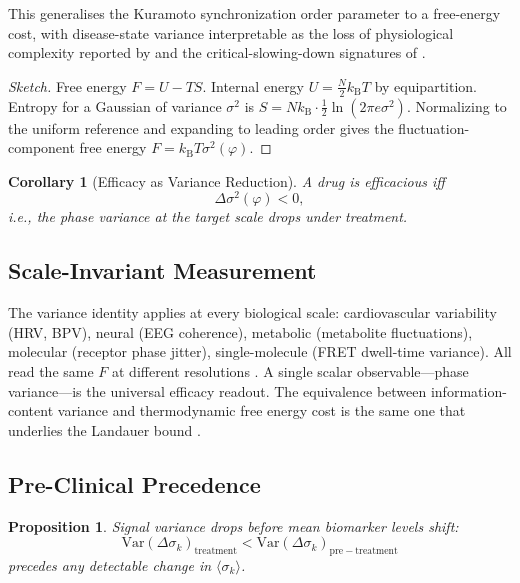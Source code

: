 \documentclass[twocolumn,10pt,a4paper]{article}
\newtheorem{proposition}[theorem]{Proposition}
\newtheorem{corollary}[theorem]{Corollary}
\theoremstyle{definition}
\theoremstyle{remark}
\newcommand{\kB}{k_{\mathrm{B}}}
\begin{document}
This generalises the Kuramoto synchronization order parameter \citep{kuramoto_1975,strogatz_2000,acebron_2005} to a free-energy cost, with disease-state variance interpretable as the loss of physiological complexity reported by \citet{goldberger_2002} and the critical-slowing-down signatures of \citet{scheffer_2009}.

\begin{proof}[Sketch]
Free energy $F = U - TS$. Internal energy $U = \tfrac{N}{2}\kB T$ by equipartition. Entropy for a Gaussian of variance $\sigma^2$ is $S = N\kB\cdot\tfrac{1}{2}\ln(2\pi e\sigma^2)$. Normalizing to the uniform reference and expanding to leading order gives the fluctuation-component free energy $F = \kB T\sigma^2(\varphi)$.
\end{proof}

\begin{corollary}[Efficacy as Variance Reduction]
A drug is efficacious iff
\begin{equation}
    \Delta\sigma^2(\varphi) < 0,
\end{equation}
i.e., the phase variance at the target scale drops under treatment.
\end{corollary}

\subsection{Scale-Invariant Measurement}

The variance identity applies at every biological scale: cardiovascular variability (HRV, BPV), neural (EEG coherence), metabolic (metabolite fluctuations), molecular (receptor phase jitter), single-molecule (FRET dwell-time variance). All read the same $F$ at different resolutions \citep{goldberger_2002,scheffer_2009}. A single scalar observable---phase variance---is the universal efficacy readout. The equivalence between information-content variance and thermodynamic free energy cost is the same one that underlies the Landauer bound \citep{landauer_1961,shannon_1948}.

\subsection{Pre-Clinical Precedence}

\begin{proposition}
Signal variance drops before mean biomarker levels shift:
\begin{equation}
    \mathrm{Var}(\Delta\sigma_k)_{\mathrm{treatment}} < \mathrm{Var}(\Delta\sigma_k)_{\mathrm{pre-treatment}}
\end{equation}
precedes any detectable change in $\langle\sigma_k\rangle$.
\end{proposition}
\end{document}

